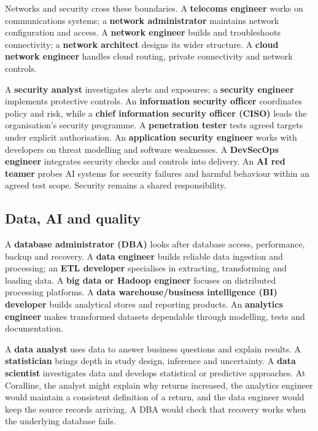 Networks and security cross these boundaries. A \textbf{telecoms engineer} works on communications systems; a \textbf{network administrator} maintains network configuration and access. A \textbf{network engineer} builds and troubleshoots connectivity; a \textbf{network architect} designs its wider structure. A \textbf{cloud network engineer} handles cloud routing, private connectivity and network controls.


A \textbf{security analyst} investigates alerts and exposures; a \textbf{security engineer} implements protective controls. An \textbf{information security officer} coordinates policy and risk, while a \textbf{chief information security officer (CISO)} leads the organisation's security programme. A \textbf{penetration tester} tests agreed targets under explicit authorisation. An \textbf{application security engineer} works with developers on threat modelling and software weaknesses. A \textbf{DevSecOps engineer} integrates security checks and controls into delivery. An \textbf{AI red teamer} probes AI systems for security failures and harmful behaviour within an agreed test scope. Security remains a shared responsibility. \autocite{microsoft-ai-red-team-roles}



\subsection{Data, AI and quality}


A \textbf{database administrator (DBA)} looks after database access, performance, backup and recovery. A \textbf{data engineer} builds reliable data ingestion and processing; an \textbf{ETL developer} specialises in extracting, transforming and loading data. A \textbf{big data or Hadoop engineer} focuses on distributed processing platforms. A \textbf{data warehouse/business intelligence (BI) developer} builds analytical stores and reporting products. An \textbf{analytics engineer} makes transformed datasets dependable through modelling, tests and documentation. \autocite{dbt-analytics-roles}


A \textbf{data analyst} uses data to answer business questions and explain results. A \textbf{statistician} brings depth in study design, inference and uncertainty. A \textbf{data scientist} investigates data and develops statistical or predictive approaches. At Coralline, the analyst might explain why returns increased, the analytics engineer would maintain a consistent definition of a return, and the data engineer would keep the source records arriving. A DBA would check that recovery works when the underlying database fails.


